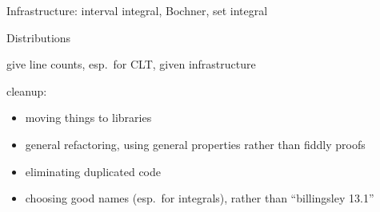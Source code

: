\documentclass{svjour3}
\begin{document}
Infrastructure: interval integral, Bochner, set integral

Distributions

give line counts, esp.~for CLT, given infrastructure


cleanup:
\begin{itemize}
 \item moving things to libraries
 \item general refactoring, using general properties rather than fiddly proofs
 \item eliminating duplicated code
 \item choosing good names (esp.~for integrals), rather than ``billingsley 13.1''
\end{itemize}
\end{document}
